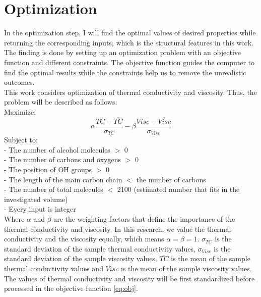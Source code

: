 \section{Optimization}
In the optimization step, I will find the optimal values of desired properties 
while returning the corresponding inputs, which is the structural features in 
this work. The finding is done by setting up an optimization problem with an 
objective function and different constraints. The objective function guides 
the computer to find the optimal results while the constraints help us to 
remove the unrealistic outcomes.\\
This work considers optimization of thermal conductivity and viscosity. 
Thus, the problem will be described as follows:\\
Maximize:
\begin{equation}
    \alpha \frac{T C-\overline{T C}}{\sigma_{T C}}-\beta \frac{V i s c-\overline{V i s c}}{\sigma_{V i s c}}
    \label{eq:obj} 
\end{equation}
Subject to:\\
- The number of alcohol molecules $>$ 0\\
- The number of carbons and oxygens $>$ 0\\
- The position of OH groups $>$ 0\\
- The length of the main carbon chain $<$ the number of carbons\\
- The number of total molecules $<$ 2100 (estimated number that fits in the investigated volume)\\
- Every input is integer\\
Where $\alpha$ and $\beta$ are the weighting factors that define the importance of the 
thermal conductivity and viscosity. In this research, we value the thermal 
conductivity and the viscosity equally, which means $\alpha=\beta=1$. $\sigma_{T C}$ is the standard 
deviation of the sample thermal conductivity values, $\sigma_{Visc}$ is the standard 
deviation of the sample viscosity values, $\overline{T C}$ is the mean of the sample 
thermal conductivity values and $\overline{V i s c}$ is the mean of the sample viscosity 
values. The values of thermal conductivity and viscosity will be first 
standardized before processed in the objective function \ref{eq:obj}.



